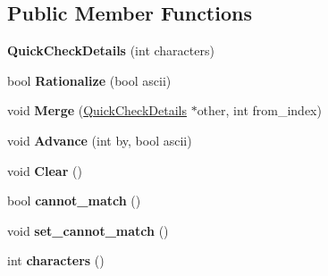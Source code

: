 \subsection*{Public Member Functions}
\begin{DoxyCompactItemize}
\item 
\hypertarget{classv8_1_1internal_1_1_quick_check_details_a540a949efa3f0606f9220d43a345af57}{}{\bfseries Quick\+Check\+Details} (int characters)\label{classv8_1_1internal_1_1_quick_check_details_a540a949efa3f0606f9220d43a345af57}

\item 
\hypertarget{classv8_1_1internal_1_1_quick_check_details_a499b1c15c65e744368f18d189af024e7}{}bool {\bfseries Rationalize} (bool ascii)\label{classv8_1_1internal_1_1_quick_check_details_a499b1c15c65e744368f18d189af024e7}

\item 
\hypertarget{classv8_1_1internal_1_1_quick_check_details_a9275db5377df23388eddc8442aca75be}{}void {\bfseries Merge} (\hyperlink{classv8_1_1internal_1_1_quick_check_details}{Quick\+Check\+Details} $\ast$other, int from\+\_\+index)\label{classv8_1_1internal_1_1_quick_check_details_a9275db5377df23388eddc8442aca75be}

\item 
\hypertarget{classv8_1_1internal_1_1_quick_check_details_a4125fe3b72d0c893e36fa3414457a11d}{}void {\bfseries Advance} (int by, bool ascii)\label{classv8_1_1internal_1_1_quick_check_details_a4125fe3b72d0c893e36fa3414457a11d}

\item 
\hypertarget{classv8_1_1internal_1_1_quick_check_details_ab10e327768c54ba36aa3cc084967380c}{}void {\bfseries Clear} ()\label{classv8_1_1internal_1_1_quick_check_details_ab10e327768c54ba36aa3cc084967380c}

\item 
\hypertarget{classv8_1_1internal_1_1_quick_check_details_a1ac4fec9167d102e73065ba875310e90}{}bool {\bfseries cannot\+\_\+match} ()\label{classv8_1_1internal_1_1_quick_check_details_a1ac4fec9167d102e73065ba875310e90}

\item 
\hypertarget{classv8_1_1internal_1_1_quick_check_details_ade659b1430587d338aa382e56b712cdf}{}void {\bfseries set\+\_\+cannot\+\_\+match} ()\label{classv8_1_1internal_1_1_quick_check_details_ade659b1430587d338aa382e56b712cdf}

\item 
\hypertarget{classv8_1_1internal_1_1_quick_check_details_a1f86e113158421aefc278c15c1de0511}{}int {\bfseries characters} ()\label{classv8_1_1internal_1_1_quick_check_details_a1f86e113158421aefc278c15c1de0511}


\end{DoxyCompactItemize}
